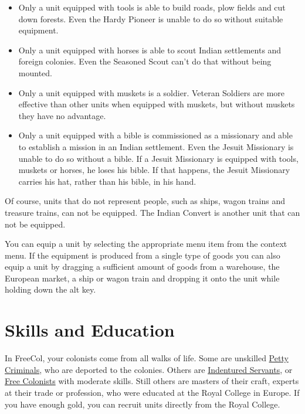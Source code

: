 \documentclass[12pt]{book}
\begin{document}
\begin{itemize}
\item Only a unit equipped with tools is able to build roads, plow
  fields and cut down forests. Even the Hardy Pioneer is unable to do
  so without suitable equipment.

\item Only a unit equipped with horses is able to scout Indian
  settlements and foreign colonies. Even the Seasoned Scout can't do
  that without being mounted.

\item Only a unit equipped with muskets is a soldier. Veteran Soldiers
  are more effective than other units when equipped with muskets, but
  without muskets they have no advantage.

\item Only a unit equipped with a bible is commissioned as a
  missionary and able to establish a mission in an Indian
  settlement. Even the Jesuit Missionary is unable to do so without a
  bible. If a Jesuit Missionary is equipped with tools, muskets or
  horses, he loses his bible. If that happens, the Jesuit Missionary
  carries his hat, rather than his bible, in his hand.
\end{itemize}

Of course, units that do not represent people, such as ships, wagon
trains and treasure trains, can not be equipped. The Indian Convert is
another unit that can not be equipped.

You can equip a unit by selecting the appropriate menu item from the
context menu. If the equipment is produced from a single type of goods
you can also equip a unit by dragging a sufficient amount of goods
from a warehouse, the European market, a ship or wagon train and
dropping it onto the unit while holding down the alt key.


\hypertarget{Skills and Education}{\section{Skills and Education}}

In FreeCol, your colonists come from all walks of life. Some are
unskilled \hyperlink{Petty Criminal}{Petty Criminals}, who are
deported to the colonies. Others are \hyperlink{Indentured
Servant}{Indentured Servants}, or \hyperlink{Free Colonist}{Free
Colonists} with moderate skills. Still others are masters of their
craft, experts at their trade or profession, who were educated at the
Royal College in Europe. If you have enough gold, you can recruit
units directly from the Royal College.
\end{document}
